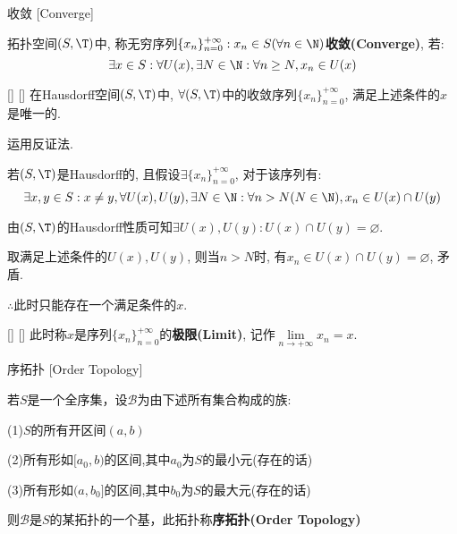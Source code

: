 \documentclass[UTF8]{ctexart}
\begin{document}
            \begin{dfn}
                {收敛}
                [Converge]

                拓扑空间$(S,\T)$中, 称无穷序列$\{x_n\}_{n=0}^{+\infty}: x_n\in S(\forall n\in\N)$\textbf{收敛(Converge)}, 若: 
                \[\exists x\in S: \forall U(x), \exists N\in\N: \forall n\geq N, x_n\in U(x)\]
            \end{dfn}
            
            \begin{thm}
                []
                {}
                []
                []
                在Hausdorff空间$(S,\T)$中, $\forall(S,\T)$中的收敛序列$\{x_n\}_{n=0}^{+\infty}$, 满足上述条件的$x$是唯一的. 
            \end{thm}
            
            \begin{prf}

                运用反证法. 

                若$(S,\T)$是Hausdorff的, 且假设$\exists\{x_n\}_{n=0}^{+\infty}$, 对于该序列有: 
                \[\exists x,y\in S: x\neq y, \forall U(x), U(y), \exists N\in\N: \forall n>N(N\in\N), x_n\in U(x)\cap U(y)\]
                
                由$(S,\T)$的Hausdorff性质可知$\exists U(x), U(y): U(x)\cap U(y)=\varnothing$. 

                取满足上述条件的$U(x), U(y)$, 则当$n>N$时, 有$x_n\in U(x)\cap U(y)=\varnothing$, 矛盾. 

                $\therefore$此时只能存在一个满足条件的$x$. 

            \end{prf}
                
            \begin{dfn}
                []
                {}
                []
                []
                此时称$x$是序列$\{x_n\}_{n=0}^{+\infty}$的\textbf{极限(Limit)}, 记作$\lim\limits_{n\to+\infty}x_n=x$. 
            \end{dfn}
            
            \begin{dfn}
                {序拓扑}
                [Order Topology]

                若$S$是一个全序集，设$\mathcal{B}$为由下述所有集合构成的族:

                (1)$S$的所有开区间$(a,b)$

                (2)所有形如$[a_0,b)$的区间,其中$a_0$为$S$的最小元(存在的话)

                (3)所有形如$(a,b_0]$的区间,其中$b_0$为$S$的最大元(存在的话)

                则$\mathcal{B}$是$S$的某拓扑的一个基，此拓扑称\textbf{序拓扑(Order Topology)}
            \end{dfn}
\end{document}
